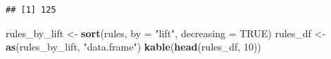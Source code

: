 \documentclass[
]{article}
\newenvironment{Shaded}{\begin{snugshade}}{\end{snugshade}}
\newcommand{\AttributeTok}[1]{\textcolor[rgb]{0.13,0.29,0.53}{#1}}
\newcommand{\ConstantTok}[1]{\textcolor[rgb]{0.56,0.35,0.01}{#1}}
\newcommand{\DecValTok}[1]{\textcolor[rgb]{0.00,0.00,0.81}{#1}}
\newcommand{\FunctionTok}[1]{\textcolor[rgb]{0.13,0.29,0.53}{\textbf{#1}}}
\newcommand{\NormalTok}[1]{#1}
\newcommand{\OtherTok}[1]{\textcolor[rgb]{0.56,0.35,0.01}{#1}}
\newcommand{\StringTok}[1]{\textcolor[rgb]{0.31,0.60,0.02}{#1}}
\begin{document}
\begin{verbatim}
## [1] 125
\end{verbatim}

\begin{Shaded}
\begin{Highlighting}[]
\NormalTok{rules\_by\_lift }\OtherTok{\textless{}{-}} \FunctionTok{sort}\NormalTok{(rules, }\AttributeTok{by =} \StringTok{"lift"}\NormalTok{, }\AttributeTok{decreasing =} \ConstantTok{TRUE}\NormalTok{)}
\NormalTok{rules\_df }\OtherTok{\textless{}{-}} \FunctionTok{as}\NormalTok{(rules\_by\_lift, }\StringTok{"data.frame"}\NormalTok{)}
\FunctionTok{kable}\NormalTok{(}\FunctionTok{head}\NormalTok{(rules\_df, }\DecValTok{10}\NormalTok{))}
\end{Highlighting}
\end{Shaded}
\end{document}
